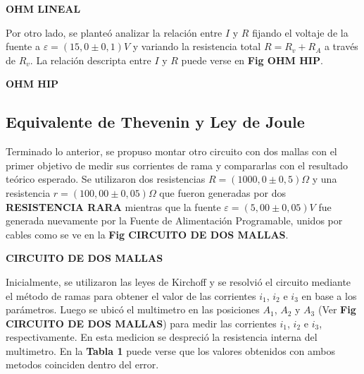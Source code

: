\documentclass[11pt,a4paper]{article}
\begin{document}
\textbf{OHM LINEAL}

Por otro lado, se planteó analizar la relación entre $I$ y $R$ fijando el voltaje de la fuente a $\varepsilon = (15,0 \pm 0,1)V$ y variando la resistencia total $R = R_v + R_A$ a través de $R_v$. La relación descripta entre $I$ y $R$ puede verse en \textbf{Fig OHM HIP}.

\textbf{OHM HIP}

\subsection{Equivalente de Thevenin y Ley de Joule}

Terminado lo anterior, se propuso montar otro circuito con dos mallas con el primer objetivo de medir sus corrientes de rama y compararlas con el resultado teórico esperado. Se utilizaron dos resistencias $R = (1000,0\pm0,5)\Omega$ y una resistencia $r = (100,00\pm0,05)\Omega$ que fueron generadas por dos \textbf{RESISTENCIA RARA} mientras que la fuente $\varepsilon = (5,00\pm0,05)V$ fue generada nuevamente por la Fuente de Alimentación Programable, unidos por cables como se ve en la \textbf{Fig CIRCUITO DE DOS MALLAS}.

\textbf{CIRCUITO DE DOS MALLAS}

 Inicialmente, se utilizaron las leyes de Kirchoff y se resolvió el circuito mediante el método de ramas para obtener el valor de las corrientes $i_1$, $i_2$ e $i_3$ en base a los parámetros. Luego se ubicó el multimetro en las posiciones $A_1$, $A_2$ y $A_3$ (Ver \textbf{Fig CIRCUITO DE DOS MALLAS})  para medir las corrientes $i_1$, $i_2$ e $i_3$, respectivamente. En esta medicion se despreció la resistencia interna del multimetro. En la \textbf{Tabla 1} puede verse que los valores obtenidos con ambos metodos coinciden dentro del error. 
\end{document}
